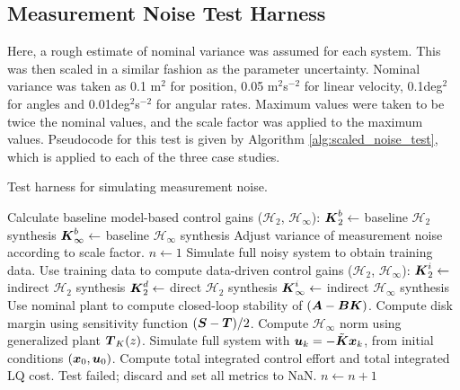 \subsection{Measurement Noise Test Harness}
Here, a rough estimate of nominal variance was assumed for each system.  This was then scaled in a similar fashion as the parameter uncertainty.  Nominal variance was taken as 0.1 m$^{2}$ for position, 0.05 m$^{2}$s$^{-2}$ for linear velocity, 0.1deg$^{2}$ for angles and 0.01deg$^{2}$s$^{-2}$ for angular rates.  Maximum values were taken to be twice the nominal values, and the scale factor was applied to the maximum values.  Pseudocode for this test is given by Algorithm \ref{alg:scaled_noise_test}, which is applied to each of the three case studies.

\begin{algorithm}
\caption{Test harness for simulating measurement noise.}
\label{alg:scaled_noise_test}
\begin{algorithmic}
	\State Calculate baseline model-based control gains ($\mathcal{H}_{2}$, $\mathcal{H}_{\infty}$):
	\State \hspace{10pt} $\vb*{K}_{2}^{b} \gets $ baseline $\mathcal{H}_{2}$ synthesis
	\State \hspace{10pt} $\vb*{K}_{\infty}^{b} \gets $ baseline $\mathcal{H}_{\infty}$ synthesis
		\State Adjust variance of measurement noise according to scale factor.
		\State $n \gets 1$
			\State Simulate full noisy system to obtain training data.
			\State Use training data to compute data-driven control gains ($\mathcal{H}_{2}$, $\mathcal{H}_{\infty}$):
			\State \hspace{10pt} $\vb*{K}_{2}^{i} \gets $ indirect $\mathcal{H}_{2}$ synthesis
			\State \hspace{10pt} $\vb*{K}_{2}^{d} \gets $ direct $\mathcal{H}_{2}$ synthesis
			\State \hspace{10pt} $\vb*{K}_{\infty}^{i} \gets $ indirect $\mathcal{H}_{\infty}$ synthesis
				\State Use nominal plant to compute closed-loop stability of $(\vb*{A} - \vb*{B}\vb*{K})$.
					\State Compute disk margin using sensitivity function $(\vb*{S} - \vb*{T})/2$.
					\State Compute $\mathcal{H}_{\infty}$ norm using generalized plant $\vb*{T}_{K}(z)$.
					\State Simulate full system with $\vb*{u}_{k} = -\tilde{\vb*{K}}\vb*{x}_{k}$, from initial conditions $(\vb*{x}_{0},\vb*{u}_{0})$.
					\State Compute total integrated control effort and total integrated LQ cost.
				\Else
					\State Test failed; discard and set all metrics to NaN.
				\EndIf
			\EndFor
		\State $n \gets n + 1$
		\EndWhile
	\EndFor
\end{algorithmic}
\end{algorithm}

